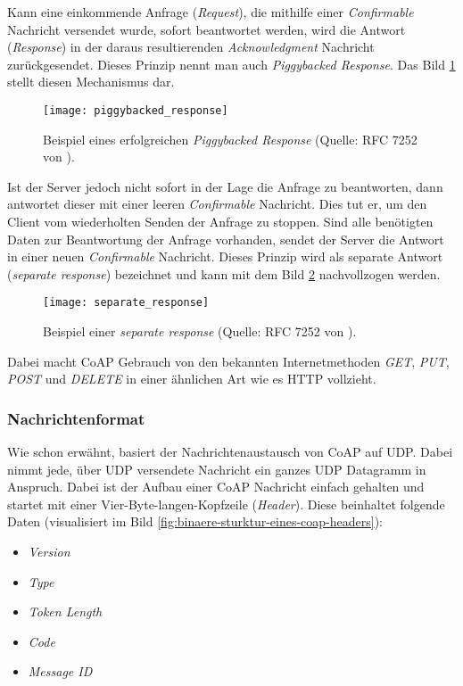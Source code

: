 Kann eine einkommende Anfrage (\textit{Request}), die mithilfe einer \textit{Confirmable} Nachricht versendet wurde, sofort beantwortet werden, wird die Antwort (\textit{Response}) in der daraus resultierenden \textit{Acknowledgment} Nachricht zurückgesendet. Dieses Prinzip nennt man auch \textit{Piggybacked Response}. Das Bild \ref{fig:beispiel-eines-erfolgreichen-piggybacked-response} stellt diesen Mechanismus dar.

\begin{figure}[h]
    \centering
    \texttt{[image: piggybacked\_response]}
    \caption{Beispiel eines erfolgreichen \textit{Piggybacked Response} (Quelle: RFC 7252 von  \citeauthor{RFC7252} \cite{RFC7252}).}
    \label{fig:beispiel-eines-erfolgreichen-piggybacked-response}
\end{figure}

Ist der Server jedoch nicht sofort in der Lage die Anfrage zu beantworten, dann antwortet dieser mit einer leeren \textit{Confirmable} Nachricht. Dies tut er, um den Client vom wiederholten Senden der Anfrage zu stoppen. Sind alle benötigten Daten zur Beantwortung der Anfrage vorhanden, sendet der Server die Antwort in einer neuen \textit{Confirmable} Nachricht. Dieses Prinzip wird als separate Antwort (\textit{separate response}) bezeichnet und kann mit dem Bild \ref{fig:beispiel-einer-separate-response} nachvollzogen werden.

\begin{figure}[h]
    \centering
    \texttt{[image: separate\_response]}
    \caption{Beispiel einer \textit{separate response} (Quelle: RFC 7252 von  \citeauthor{RFC7252} \cite{RFC7252}).}
    \label{fig:beispiel-einer-separate-response}
\end{figure}

Dabei macht CoAP Gebrauch von den bekannten Internetmethoden \textit{GET}, \textit{PUT}, \textit{POST} und \textit{DELETE} in einer ähnlichen Art wie es HTTP vollzieht.

\subsubsection{Nachrichtenformat}
\label{subsubsec:nachrichtenformat}

Wie schon erwähnt, basiert der Nachrichtenaustausch von CoAP auf UDP. Dabei nimmt jede, über UDP versendete Nachricht ein ganzes UDP Datagramm in Anspruch. Dabei ist der Aufbau einer CoAP Nachricht einfach gehalten und startet mit einer Vier-Byte-langen-Kopfzeile (\textit{Header}). Diese beinhaltet folgende Daten (visualisiert im Bild \ref{fig:binaere-sturktur-eines-coap-headers}):
\begin{itemize}
    \item \textit{Version}
    \item \textit{Type}
    \item \textit{Token Length}
    \item \textit{Code}
    \item \textit{Message ID}
\end{itemize}

